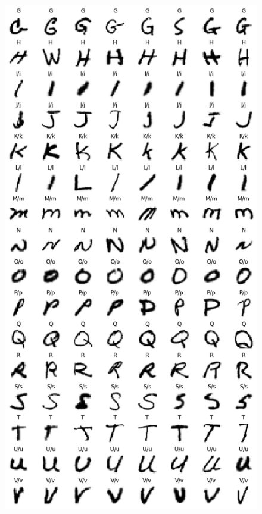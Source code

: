 \documentclass[12pt, spanish]{article}
\begin{document}
\begin{figure}[hbt!]
\begin{minipage}{.33\textwidth}
\end{minipage}%
\begin{minipage}{.33\textwidth}
  \centering
  \includegraphics[width=.95\linewidth]{images/samples_by_label2.png}
\end{minipage}%
\begin{minipage}{.33\textwidth}
  \centering

\end{minipage}
\end{figure}
\end{document}
